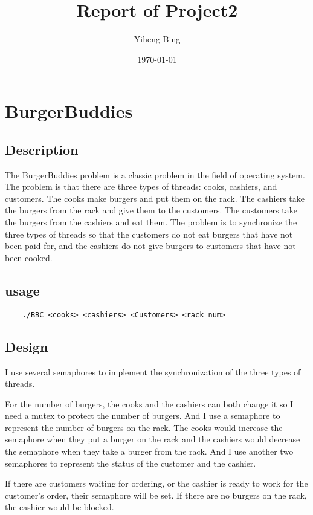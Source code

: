 \documentclass[a4paper]{article}
\title{Report of Project2}
\author{Yiheng Bing}
\date{\today}
\begin{document}
\maketitle

\section{BurgerBuddies}

\subsection{Description}

The BurgerBuddies problem is a classic problem in the field of operating system. The problem is that there are three types of threads: cooks, cashiers, and customers. The cooks make burgers and put them on the rack. The cashiers take the burgers from the rack and give them to the customers. The customers take the burgers from the cashiers and eat them. The problem is to synchronize the three types of threads so that the customers do not eat burgers that have not been paid for, and the cashiers do not give burgers to customers that have not been cooked.

\subsection{usage}

\begin{lstlisting}
    ./BBC <cooks> <cashiers> <Customers> <rack_num>
\end{lstlisting}

\subsection{Design}

I use several semaphores to implement the synchronization of the three types of threads. 

For the number of burgers, the cooks and the cashiers can both change it so I need a mutex to protect the number of burgers. 
And I use a semaphore to represent the number of burgers on the rack. 
The cooks would increase the semaphore when they put a burger on the rack and the cashiers would decrease the semaphore when they take a burger from the rack. 
And I use another two semaphores to represent the status of the customer and the cashier. 

If there are customers waiting for ordering, or the cashier is ready to work for the customer's order, their semaphore will be set. 
If there are no burgers on the rack, the cashier would be blocked. 
\end{document}

